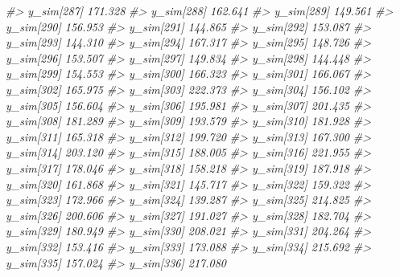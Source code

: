 \documentclass[
  10pt,
  italian,
  a4paper,
  extrafontsizes,onecolumn,openright
  ]{memoir}
\newenvironment{Shaded}{\begin{snugshade}}{\end{snugshade}}
\newcommand{\CommentTok}[1]{\textcolor[rgb]{0.56,0.35,0.01}{\textit{#1}}}
\begin{document}
\begin{Shaded}
\begin{Highlighting}[]
\CommentTok{\#\textgreater{}   y\_sim[287] 171.328}
\CommentTok{\#\textgreater{}   y\_sim[288] 162.641}
\CommentTok{\#\textgreater{}   y\_sim[289] 149.561}
\CommentTok{\#\textgreater{}   y\_sim[290] 156.953}
\CommentTok{\#\textgreater{}   y\_sim[291] 144.865}
\CommentTok{\#\textgreater{}   y\_sim[292] 153.087}
\CommentTok{\#\textgreater{}   y\_sim[293] 144.310}
\CommentTok{\#\textgreater{}   y\_sim[294] 167.317}
\CommentTok{\#\textgreater{}   y\_sim[295] 148.726}
\CommentTok{\#\textgreater{}   y\_sim[296] 153.507}
\CommentTok{\#\textgreater{}   y\_sim[297] 149.834}
\CommentTok{\#\textgreater{}   y\_sim[298] 144.448}
\CommentTok{\#\textgreater{}   y\_sim[299] 154.553}
\CommentTok{\#\textgreater{}   y\_sim[300] 166.323}
\CommentTok{\#\textgreater{}   y\_sim[301] 166.067}
\CommentTok{\#\textgreater{}   y\_sim[302] 165.975}
\CommentTok{\#\textgreater{}   y\_sim[303] 222.373}
\CommentTok{\#\textgreater{}   y\_sim[304] 156.102}
\CommentTok{\#\textgreater{}   y\_sim[305] 156.604}
\CommentTok{\#\textgreater{}   y\_sim[306] 195.981}
\CommentTok{\#\textgreater{}   y\_sim[307] 201.435}
\CommentTok{\#\textgreater{}   y\_sim[308] 181.289}
\CommentTok{\#\textgreater{}   y\_sim[309] 193.579}
\CommentTok{\#\textgreater{}   y\_sim[310] 181.928}
\CommentTok{\#\textgreater{}   y\_sim[311] 165.318}
\CommentTok{\#\textgreater{}   y\_sim[312] 199.720}
\CommentTok{\#\textgreater{}   y\_sim[313] 167.300}
\CommentTok{\#\textgreater{}   y\_sim[314] 203.120}
\CommentTok{\#\textgreater{}   y\_sim[315] 188.005}
\CommentTok{\#\textgreater{}   y\_sim[316] 221.955}
\CommentTok{\#\textgreater{}   y\_sim[317] 178.046}
\CommentTok{\#\textgreater{}   y\_sim[318] 158.218}
\CommentTok{\#\textgreater{}   y\_sim[319] 187.918}
\CommentTok{\#\textgreater{}   y\_sim[320] 161.868}
\CommentTok{\#\textgreater{}   y\_sim[321] 145.717}
\CommentTok{\#\textgreater{}   y\_sim[322] 159.322}
\CommentTok{\#\textgreater{}   y\_sim[323] 172.966}
\CommentTok{\#\textgreater{}   y\_sim[324] 139.287}
\CommentTok{\#\textgreater{}   y\_sim[325] 214.825}
\CommentTok{\#\textgreater{}   y\_sim[326] 200.606}
\CommentTok{\#\textgreater{}   y\_sim[327] 191.027}
\CommentTok{\#\textgreater{}   y\_sim[328] 182.704}
\CommentTok{\#\textgreater{}   y\_sim[329] 180.949}
\CommentTok{\#\textgreater{}   y\_sim[330] 208.021}
\CommentTok{\#\textgreater{}   y\_sim[331] 204.264}
\CommentTok{\#\textgreater{}   y\_sim[332] 153.416}
\CommentTok{\#\textgreater{}   y\_sim[333] 173.088}
\CommentTok{\#\textgreater{}   y\_sim[334] 215.692}
\CommentTok{\#\textgreater{}   y\_sim[335] 157.024}
\CommentTok{\#\textgreater{}   y\_sim[336] 217.080}

\end{Highlighting}
\end{Shaded}
\end{document}
